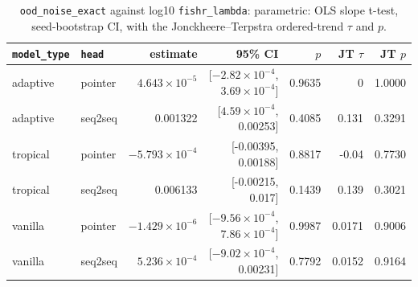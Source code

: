 \documentclass[10pt]{article}
\begin{document}
{\small
\begin{longtable}{llrrrrr}
\caption{\texttt{ood\_noise\_exact} against log10 \texttt{fishr\_lambda}: parametric: OLS slope t-test, seed-bootstrap CI, with the Jonckheere--Terpstra ordered-trend $\tau$ and $p$.}\label{tab:trend-ood_noise_exact}\\
\toprule
\texttt{model\_type} & \texttt{head} & estimate & 95\% CI & $p$ & JT $\tau$ & JT $p$\\
\midrule
\endhead
adaptive & pointer & $4.643\times10^{-5}$ & [$-2.82\times10^{-4}$, $3.69\times10^{-4}$] & 0.9635 & 0 & 1.0000\\
adaptive & seq2seq & 0.001322 & [$4.59\times10^{-4}$, 0.00253] & 0.4085 & 0.131 & 0.3291\\
tropical & pointer & $-5.793\times10^{-4}$ & [-0.00395, 0.00188] & 0.8817 & -0.04 & 0.7730\\
tropical & seq2seq & 0.006133 & [-0.00215, 0.017] & 0.1439 & 0.139 & 0.3021\\
vanilla & pointer & $-1.429\times10^{-6}$ & [$-9.56\times10^{-4}$, $7.86\times10^{-4}$] & 0.9987 & 0.0171 & 0.9006\\
vanilla & seq2seq & $5.236\times10^{-4}$ & [$-9.02\times10^{-4}$, 0.00231] & 0.7792 & 0.0152 & 0.9164\\
\bottomrule
\end{longtable}
}
\end{document}

